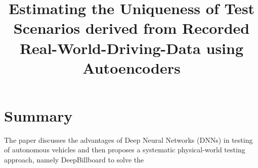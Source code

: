 \documentclass[10pt,a4paper]{report}
\title{Estimating the Uniqueness of Test Scenarios derived from Recorded Real-World-Driving-Data using Autoencoders}
\begin{document}
\begin{center}
\textbf{\thetitle}
\end{center}


\section{Summary}
The paper discusses the advantages of Deep Neural Networks (DNNs) in testing of autonomous vehicles and then proposes a systematic physical-world testing approach, namely DeepBillboard to solve the 
\end{document}
